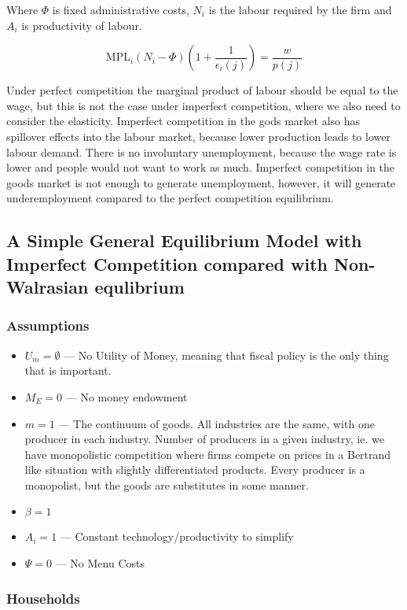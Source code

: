  

 Where $\Phi$ is fixed administrative costs, $N_i$ is the labour required by the firm and $A_i$ is productivity of labour. 
 
 $$
 \text{MPL}_i (N_i - \Phi ) \left( 1 + \frac{1}{\epsilon_i (j)} \right) = \frac{w}{p(j)}
 $$
 
  Under perfect competition the marginal product of labour should be equal to the wage, but this is not the case under imperfect competition, where we also need to consider the elasticity.
 Imperfect competition in the gods market also has spillover effects into the labour market, because lower production leads to lower labour demand. There is no involuntary unemployment, because the wage rate is lower and people would not want to work as much. Imperfect competition in the goods market is not enough to generate unemployment, however, it will generate underemployment compared to the perfect competition equilibrium. 
 
 
 \subsection{A Simple General Equilibrium Model with Imperfect Competition compared with Non-Walrasian equlibrium}
 
 \subsubsection{Assumptions}
 \begin{itemize}
     \item $U_m = \emptyset$ --- No Utility of Money, meaning that fiscal policy is the only thing that is important. 
     \item $M_E = 0$ --- No money endowment
     \item $m = 1$ --- The continuum of goods. All industries are the same, with one producer in each industry. Number of producers in a given industry, ie. we have monopolistic competition where firms compete on prices in a Bertrand like situation with slightly differentiated products. Every producer is a monopolist, but the goods are substitutes in some manner.  
     \item $\beta  = 1 $
     \item $A_i = 1$ --- Constant technology/productivity to simplify
     \item $\Psi = 0$ --- No Menu Costs
\end{itemize}

\subsubsection{Households}


